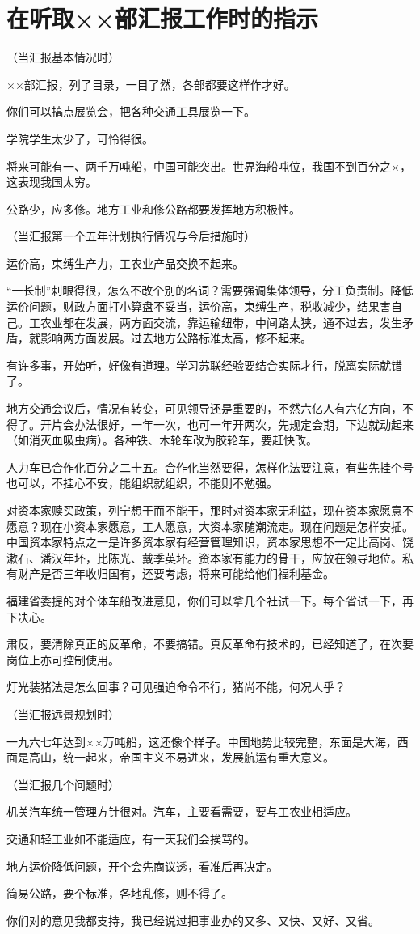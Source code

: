 \section[在听取××部汇报工作时的指示（一九五六年三月八日）]{在听取××部汇报工作时的指示}


（当汇报基本情况时）

××部汇报，列了目录，一目了然，各部都要这样作才好。

你们可以搞点展览会，把各种交通工具展览一下。

学院学生太少了，可怜得很。

将来可能有一、两千万吨船，中国可能突出。世界海船吨位，我国不到百分之×，这表现我国太穷。

公路少，应多修。地方工业和修公路都要发挥地方积极性。

（当汇报第一个五年计划执行情况与今后措施时）

运价高，束缚生产力，工农业产品交换不起来。

“一长制”刺眼得很，怎么不改个别的名词？需要强调集体领导，分工负责制。降低运价问题，财政方面打小算盘不妥当，运价高，束缚生产，税收减少，结果害自己。工农业都在发展，两方面交流，靠运输纽带，中间路太狭，通不过去，发生矛盾，就影响两方面发展。过去地方公路标准太高，修不起来。

有许多事，开始听，好像有道理。学习苏联经验要结合实际才行，脱离实际就错了。

地方交通会议后，情况有转变，可见领导还是重要的，不然六亿人有六亿方向，不得了。开片会办法很好，一年一次，也可一年开两次，先规定会期，下边就动起来（如消灭血吸虫病）。各种铁、木轮车改为胶轮车，要赶快改。

人力车已合作化百分之二十五。合作化当然要得，怎样化法要注意，有些先挂个号也可以，不挂心不安，能组织就组织，不能则不勉强。

对资本家赎买政策，列宁想干而不能干，那时对资本家无利益，现在资本家愿意不愿意？现在小资本家愿意，工人愿意，大资本家随潮流走。现在问题是怎样安插。中国资本家特点之一是许多资本家有经营管理知识，资本家思想不一定比高岗、饶漱石、潘汉年坏，比陈光、戴季英坏。资本家有能力的骨干，应放在领导地位。私有财产是否三年收归国有，还要考虑，将来可能给他们福利基金。

福建省委提的对个体车船改进意见，你们可以拿几个社试一下。每个省试一下，再下决心。

肃反，要清除真正的反革命，不要搞错。真反革命有技术的，已经知道了，在次要岗位上亦可控制使用。

灯光装猪法是怎么回事？可见强迫命令不行，猪尚不能，何况人乎？

（当汇报远景规划时）

一九六七年达到××万吨船，这还像个样子。中国地势比较完整，东面是大海，西面是高山，统一起来，帝国主义不易进来，发展航运有重大意义。

（当汇报几个问题时）

机关汽车统一管理方针很对。汽车，主要看需要，要与工农业相适应。

交通和轻工业如不能适应，有一天我们会挨骂的。

地方运价降低问题，开个会先商议透，看准后再决定。

简易公路，要个标准，各地乱修，则不得了。

你们对的意见我都支持，我已经说过把事业办的又多、又快、又好、又省。


